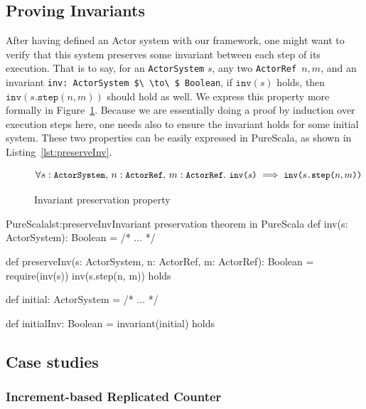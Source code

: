 \documentclass[a4paper,twoside]{article}
\newcommand{\InlineS}[1]{\lstinline[language=PureScala,basicstyle=\small\ttfamily,columns=fixed]|#1|}
\newcommand{\RefFig}[1]{Figure~\ref{#1}}
\newcommand{\RefCode}[1]{Listing~\ref{#1}}
\newcommand{\ActorRef}{\InlineS{ActorRef}\ }
\newcommand{\stt}[1]{\texttt{\small{#1}}}
\begin{document}
\subsection{Proving Invariants}
\label{invariants}

After having defined an Actor system with our framework, one might want to verify that this system preserves some invariant between each step of its execution. That is to say, for an \InlineS{ActorSystem} $s$, any two \ActorRef $n, m$, and an invariant \InlineS{inv: ActorSystem $\ \to\ $ Boolean}, if $\texttt{inv}(s)$ holds, then $\texttt{inv}(s\texttt{.step}(n, m))$ should hold as well. We express this property more formally in \RefFig{fig:stepinvariant}. Because we are essentially doing a proof by induction over execution steps here, one needs also to ensure the invariant holds for some initial system. These two properties can be easily expressed in PureScala, as shown in \RefCode{lst:preserveInv}.

\begin{figure}[!h]
$$\forall s: \stt{ActorSystem},\, n: \stt{ActorRef},\, m: \stt{ActorRef}.\ \stt{inv($s$)} \implies \stt{inv($s$.step($n, m$))}$$
\vspace{-20pt}
\caption{Invariant preservation property\label{fig:stepinvariant}}
\end{figure}

\begin{Code}{PureScala}{lst:preserveInv}{Invariant preservation theorem in PureScala}
def inv(s: ActorSystem): Boolean = {
  /* ... */
}

def preserveInv(s: ActorSystem, n: ActorRef, m: ActorRef): Boolean = {
  require(inv(s))
  inv(s.step(n, m))
} holds

def initial: ActorSystem = /* ... */

def initialInv: Boolean = {
  invariant(initial)
} holds
\end{Code}

\subsection{Case studies}
\label{casestudies}

\subsubsection{Increment-based Replicated Counter}
\label{repcounterinc}
\end{document}
